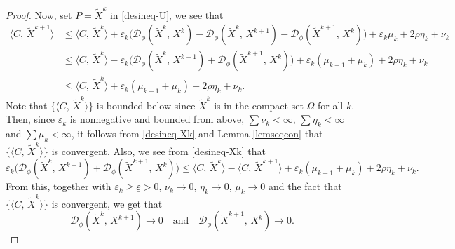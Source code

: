 \documentclass[10pt]{article}
\begin{document}
\begin{proof}
Now, set $P=\widetilde{X}^k$ in \eqref{desineq-U}, we see that
\begin{equation}\label{desineq-Xk}
\begin{aligned}
\langle C, \,\widetilde{X}^{k+1}\rangle
&\leq\langle C, \,\widetilde{X}^k\rangle + \varepsilon_k\big( \mathcal{D}_{\phi}(\widetilde{X}^k,\,X^k)
-\mathcal{D}_{\phi}(\widetilde{X}^k,\,X^{k+1}) -\mathcal{D}_{\phi}(\widetilde{X}^{k+1},\,X^k) \big)
+ \varepsilon_k\mu_k + 2\rho\eta_k + \nu_k\\
&\leq \langle C, \,\widetilde{X}^k\rangle - \varepsilon_k\big( \mathcal{D}_{\phi}(\widetilde{X}^k,\,X^{k+1}) +\mathcal{D}_{\phi}(\widetilde{X}^{k+1},\,X^k) \big) + \varepsilon_k(\mu_{k-1}+\mu_k) + 2\rho\eta_k + \nu_k \\
&\leq \langle C, \,\widetilde{X}^k\rangle + \varepsilon_k(\mu_{k-1}+\mu_k) + 2\rho\eta_k + \nu_k.
\end{aligned}
\end{equation}
Note that $\{\langle C, \,\widetilde{X}^k\rangle\}$ is bounded below since $\widetilde{X}^k$ is in the compact set $\Omega$ for all $k$. Then, since $\varepsilon_k$ is nonnegative and bounded from above, $\sum\nu_k<\infty$, $\sum\eta_k<\infty$ and $\sum\mu_k<\infty$, it follows from \eqref{desineq-Xk} and Lemma \ref{lemseqcon} that $\{\langle C, \,\widetilde{X}^k\rangle\}$ is convergent. Also, we see from \eqref{desineq-Xk} that
\begin{equation*}
\varepsilon_k\big( \mathcal{D}_{\phi}(\widetilde{X}^k,\,X^{k+1}) +\mathcal{D}_{\phi}(\widetilde{X}^{k+1},\,X^k) \big) \leq \langle C, \,\widetilde{X}^k\rangle - \langle C, \,\widetilde{X}^{k+1}\rangle + \varepsilon_k(\mu_{k-1}+\mu_k) + 2\rho\eta_k + \nu_k.
\end{equation*}
From this, together with $\varepsilon_k\geq\underline{\varepsilon}>0$, $\nu_k\to0$, $\eta_k\to0$, $\mu_k\to0$ and the fact that $\{\langle C, \,\widetilde{X}^k\rangle\}$ is convergent, we get that
\begin{equation*}%
\mathcal{D}_{\phi}(\widetilde{X}^k,\,X^{k+1}) \to 0 \quad \mathrm{and} \quad \mathcal{D}_{\phi}(\widetilde{X}^{k+1},\,X^k) \to 0.
\end{equation*}


\end{proof}
\end{document}
